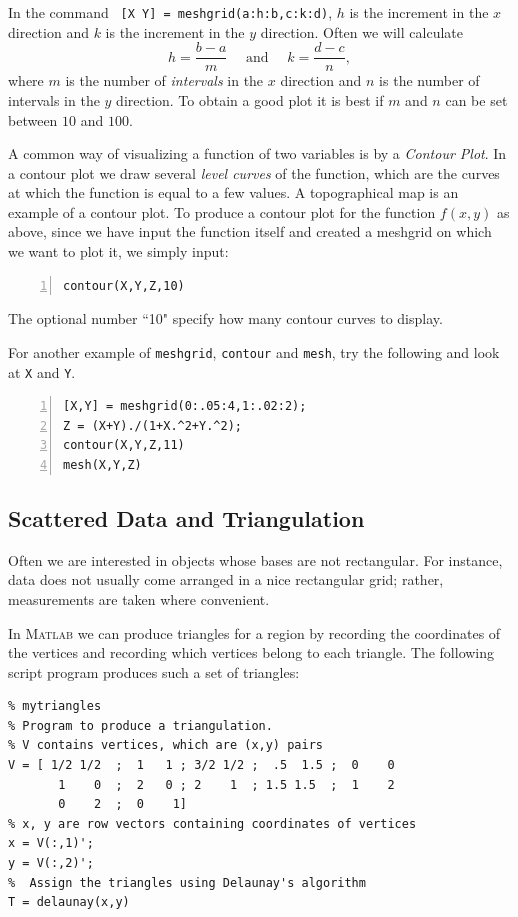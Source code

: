 In the command \verb& [X Y] = meshgrid(a:h:b,c:k:d)&, $h$ is the
increment in the $x$ direction and $k$ is the increment in the $y$
direction. Often we will calculate
$$
    h = \frac{b-a}{m}  \quad \textrm{ and } \quad k = \frac{d-c}{n},
$$
where $m$ is the number of {\em intervals} in the $x$ direction and $n$
is the number of intervals in the $y$ direction. To obtain a good plot
it is best if $m$ and $n$ can be set between $10$ and $100$.



A common way of visualizing a function of two variables is by a {\em Contour Plot}.
In a contour plot we draw several {\em level curves} of the function, which are
the curves at which the function is equal to a few values.  A topographical map
is an example of a contour plot.  To produce a contour plot for the function $f(x,y)$
as above, since we have input the function itself and created a meshgrid on which
we want to plot it, we simply input:
\begin{lstlisting}[frame=none,numbers=left]
contour(X,Y,Z,10)
\end{lstlisting}
The optional number ``10" specify how many contour curves to display.




For another example of \verb&meshgrid&, \verb&contour& and \verb&mesh&, 
try the following and look at \verb&X& and \verb&Y&.
\begin{lstlisting}[frame=none,numbers=left]
[X,Y] = meshgrid(0:.05:4,1:.02:2);
Z = (X+Y)./(1+X.^2+Y.^2);
contour(X,Y,Z,11)
mesh(X,Y,Z)
\end{lstlisting}




\subsection*{Scattered Data and Triangulation}

Often we are interested in objects whose bases are not rectangular.
For instance, data does not usually come arranged in a nice rectangular grid;
rather, measurements are taken where convenient.

In \textsc{Matlab} we can produce triangles for a region
by recording the coordinates of the vertices and recording
which vertices belong to each triangle.
The following script program produces such a set of triangles:
\begin{lstlisting}
% mytriangles
% Program to produce a triangulation.
% V contains vertices, which are (x,y) pairs
V = [ 1/2 1/2  ;  1   1 ; 3/2 1/2 ;  .5  1.5 ;  0    0
       1    0  ;  2   0 ; 2    1  ; 1.5 1.5  ;  1    2
       0    2  ;  0    1]
% x, y are row vectors containing coordinates of vertices
x = V(:,1)';
y = V(:,2)';
%  Assign the triangles using Delaunay's algorithm
T = delaunay(x,y)
\end{lstlisting}

